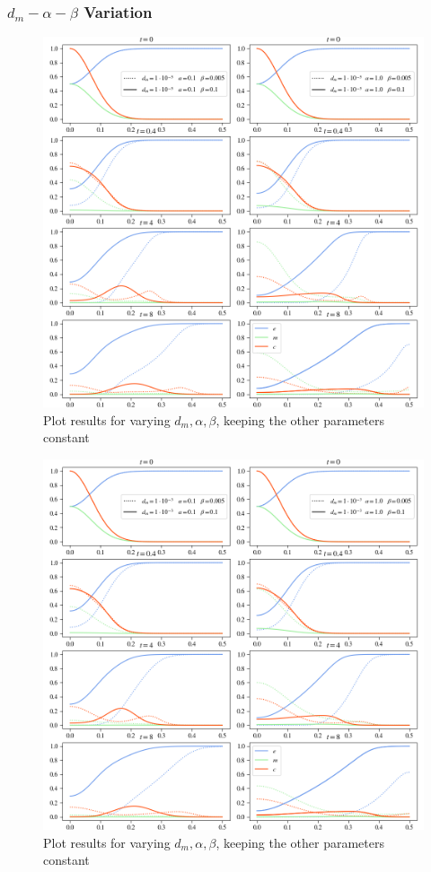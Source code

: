\subsubsection*{$d_m - \alpha - \beta$ Variation}
\begin{figure}[h!]
    \centering
    \includegraphics[width=\textwidth]{resources/images/dm_alpha_beta_variation_1.png}
    \caption{Plot results for varying $d_m, \alpha, \beta$, keeping the other parameters constant}
    \label{fig:dm_alpha_beta_variation_1}
\end{figure}
\begin{figure}[h!]
    \centering
    \includegraphics[width=\textwidth]{resources/images/dm_alpha_beta_variation_2.png}
    \caption{Plot results for varying $d_m, \alpha, \beta$, keeping the other parameters constant}
    \label{fig:dm_alpha_beta_variation_2}
\end{figure}

